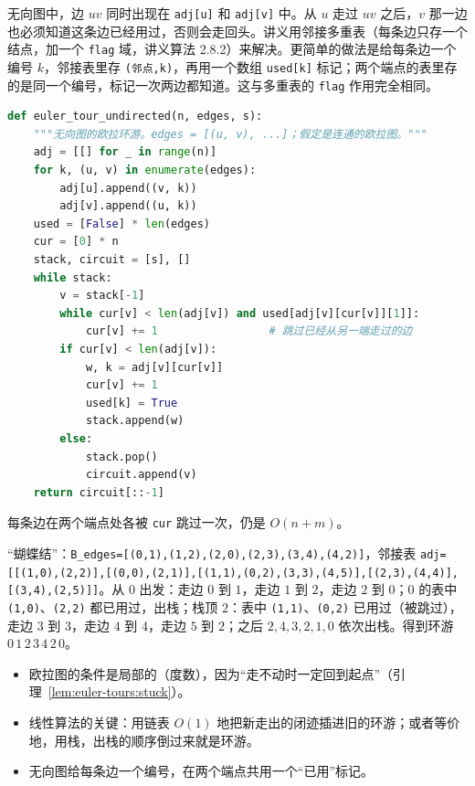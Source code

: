 
无向图中，边 $uv$ 同时出现在 \texttt{adj[u]} 和 \texttt{adj[v]} 中。从 $u$ 走过 $uv$ 之后，$v$ 那一边也必须知道这条边已经用过，否则会走回头。讲义用邻接多重表（每条边只存一个结点，加一个 \texttt{flag} 域，讲义算法 2.8.2）来解决。更简单的做法是给每条边一个编号 $k$，邻接表里存 \texttt{(邻点,k)}，再用一个数组 \texttt{used[k]} 标记；两个端点的表里存的是同一个编号，标记一次两边都知道。这与多重表的 \texttt{flag} 作用完全相同。

\begin{lstlisting}[language=Python]
def euler_tour_undirected(n, edges, s):
    """无向图的欧拉环游。edges = [(u, v), ...]；假定是连通的欧拉图。"""
    adj = [[] for _ in range(n)]
    for k, (u, v) in enumerate(edges):
        adj[u].append((v, k))
        adj[v].append((u, k))
    used = [False] * len(edges)
    cur = [0] * n
    stack, circuit = [s], []
    while stack:
        v = stack[-1]
        while cur[v] < len(adj[v]) and used[adj[v][cur[v]][1]]:
            cur[v] += 1                 # 跳过已经从另一端走过的边
        if cur[v] < len(adj[v]):
            w, k = adj[v][cur[v]]
            cur[v] += 1
            used[k] = True
            stack.append(w)
        else:
            stack.pop()
            circuit.append(v)
    return circuit[::-1]
\end{lstlisting}

每条边在两个端点处各被 \texttt{cur} 跳过一次，仍是 $O(n+m)$。

\begin{example}
“蝴蝶结”：\texttt{B\_edges=[(0,1),(1,2),(2,0),(2,3),(3,4),(4,2)]}，邻接表 \texttt{adj=[[(1,0),(2,2)],[(0,0),(2,1)],[(1,1),(0,2),(3,3),(4,5)],[(2,3),(4,4)],[(3,4),(2,5)]]}。从 $0$ 出发：走边 $0$ 到 $1$，走边 $1$ 到 $2$，走边 $2$ 到 $0$；$0$ 的表中 \texttt{(1,0)}、\texttt{(2,2)} 都已用过，出栈；栈顶 $2$：表中 \texttt{(1,1)}、\texttt{(0,2)} 已用过（被跳过），走边 $3$ 到 $3$，走边 $4$ 到 $4$，走边 $5$ 到 $2$；之后 $2,4,3,2,1,0$ 依次出栈。得到环游 $0\,1\,2\,3\,4\,2\,0$。
\end{example}


\begin{itemize}
\item 欧拉图的条件是局部的（度数），因为“走不动时一定回到起点”（引理~\ref{lem:euler-tours:stuck}）。
\item 线性算法的关键：用链表 $O(1)$ 地把新走出的闭迹插进旧的环游；或者等价地，用栈，出栈的顺序倒过来就是环游。
\item 无向图给每条边一个编号，在两个端点共用一个“已用”标记。
\end{itemize}

